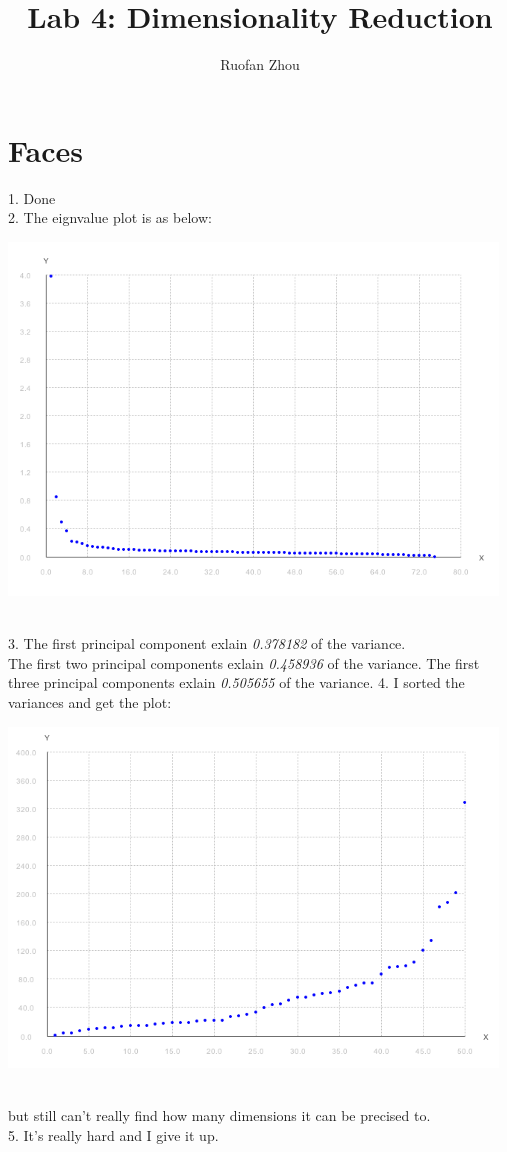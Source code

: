 \documentclass[11pt]{article} %
\title{Lab 4: Dimensionality Reduction}
\author{Ruofan Zhou}
\begin{document}
\maketitle

\section{Faces}
1. Done\\
2.  The eignvalue plot is as below:\\
\centerline{
\includegraphics[width=13cm]{pic/p4}}\\
3. The first principal component exlain \emph{0.378182} of the variance.\\
The first two principal components exlain \emph{0.458936} of the variance.
The first three principal components exlain \emph{0.505655} of the variance.
4. I sorted the variances and get the plot: \\
\centerline{
\includegraphics[width=13cm]{pic/p2}}\\
but still can't really find how many dimensions it can be precised to.\\
5. It's really hard and I give it up.\\
\end{document}

